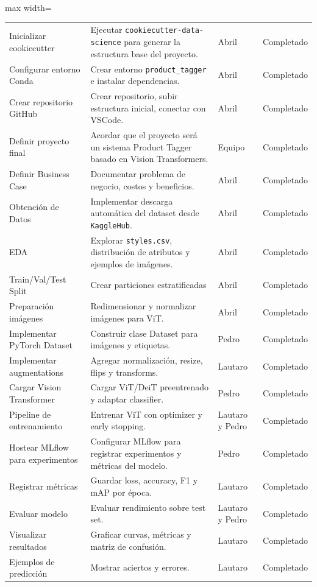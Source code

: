 \begin{table}[h]
\begin{adjustbox}{max width=\textwidth}
\begin{tabular}{p{3.3cm} p{9cm} p{1.7cm} p{1.5cm}}
Inicializar cookiecutter & Ejecutar \texttt{cookiecutter-data-science} para generar la estructura base del proyecto. & Abril & Completado \\
Configurar entorno Conda & Crear entorno \texttt{product\_tagger} e instalar dependencias. & Abril & Completado \\
Crear repositorio GitHub & Crear repositorio, subir estructura inicial, conectar con VSCode. & Abril & Completado \\
Definir proyecto final & Acordar que el proyecto será un sistema Product Tagger basado en Vision Transformers. & Equipo & Completado \\
Definir Business Case & Documentar problema de negocio, costos y beneficios. & Abril & Completado \\
Obtención de Datos & Implementar descarga automática del dataset desde \texttt{KaggleHub}. & Abril & Completado \\
EDA & Explorar \texttt{styles.csv}, distribución de atributos y ejemplos de imágenes. & Abril & Completado \\
Train/Val/Test Split & Crear particiones estratificadas & Abril & Completado \\
Preparación imágenes & Redimensionar y normalizar imágenes para ViT. & Abril & Completado \\
Implementar PyTorch Dataset & Construir clase Dataset para imágenes y etiquetas. & Pedro & Completado \\
Implementar augmentations & Agregar normalización, resize, flips y transforms. & Lautaro & Completado \\
Cargar Vision Transformer & Cargar ViT/DeiT preentrenado y adaptar classifier. & Pedro & Completado \\
Pipeline de entrenamiento & Entrenar ViT con optimizer y early stopping. & Lautaro y Pedro & Completado \\
Hostear MLflow para experimentos & Configurar MLflow para registrar experimentos y métricas del modelo. & Pedro & Completado \\
Registrar métricas & Guardar loss, accuracy, F1 y mAP por época. & Lautaro & Completado \\
Evaluar modelo & Evaluar rendimiento sobre test set. & Lautaro y Pedro & Completado \\
Visualizar resultados & Graficar curvas, métricas y matriz de confusión. & Lautaro & Completado \\
Ejemplos de predicción & Mostrar aciertos y errores. & Lautaro & Completado \\

\end{tabular}
\end{adjustbox}
\end{table}
